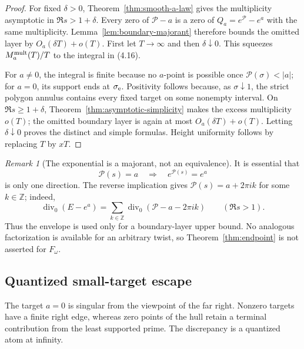 \documentclass[11pt]{article}
\theoremstyle{definition}
\theoremstyle{remark}
\newtheorem{remark}[theorem]{Remark}
\newcommand{\cP}{\mathcal P}
\DeclareMathOperator{\divisor}{div}
\begin{document}
\begin{proof}
For fixed $\delta>0$, Theorem~\ref{thm:smooth-a-law} gives the multiplicity asymptotic in
$\Re s>1+\delta$.  Every zero of $\cP-a$ is a zero of $Q_a=e^{\cP}-e^a$ with the same
multiplicity.  Lemma~\ref{lem:boundary-majorant} therefore bounds the omitted layer by
$O_a(\delta T)+o(T)$.  First let $T\to\infty$ and then $\delta\downarrow0$.
This squeezes $M_a^{\rm mult}(T)/T$ to the integral in (4.16).

For $a\ne0$, the integral is finite because no $a$-point is possible once
$\cP(\sigma)<|a|$; for $a=0$, its support ends at $\sigma_{\rm e}$.  Positivity follows
because, as $\sigma\downarrow1$, the strict polygon annulus contains every fixed
target on some nonempty interval.  On $\Re s\ge1+\delta$,
Theorem~\ref{thm:asymptotic-simplicity} makes the excess multiplicity $o(T)$; the
omitted boundary layer is again at most $O_a(\delta T)+o(T)$.  Letting
$\delta\downarrow0$ proves the distinct and simple formulas.  Height uniformity follows
by replacing $T$ by $xT$.
\end{proof}

\begin{remark}[The exponential is a majorant, not an equivalence]
\label{rem:aliases}
It is essential that
\[
 \cP(s)=a\quad\Longrightarrow\quad e^{\cP(s)}=e^a
\]
is only one direction.  The reverse implication gives
$\cP(s)=a+2\pi ik$ for some $k\in\mathbb Z$; indeed,
\[
 \divisor_0(E-e^a)
 =\sum_{k\in\mathbb Z}\divisor_0(\cP-a-2\pi ik)
 \qquad(\Re s>1).
\tag{4.19}
\]
Thus the envelope is used only for a boundary-layer upper bound.  No analogous
factorization is available for an arbitrary twist, so Theorem~\ref{thm:endpoint} is not
asserted for $F_\omega$.
\end{remark}

\subsection{Quantized small-target escape}

The target $a=0$ is singular from the viewpoint of the far right.  Nonzero targets
have a finite right edge, whereas zero points of the hull retain a terminal contribution
from the least supported prime.  The discrepancy is a quantized atom at infinity.
\end{document}
